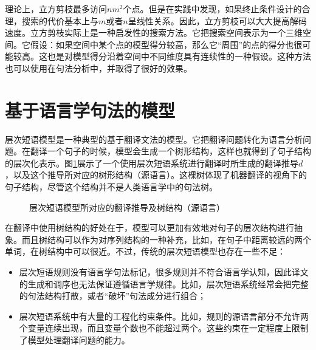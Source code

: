 \parinterval 理论上，立方剪枝最多访问$n{m}^2$个点。但是在实践中发现，如果终止条件设计的合理，搜索的代价基本上与$m$或者$n$呈线性关系。因此，立方剪枝可以大大提高解码速度。立方剪枝实际上是一种启发性的搜索方法。它把搜索空间表示为一个三维空间。它假设：如果空间中某个点的模型得分较高，那么它“周围”的点的得分也很可能较高。这也是对模型得分沿着空间中不同维度具有连续性的一种假设。这种方法也可以使用在句法分析中，并取得了很好的效果。


\sectionnewpage
\section{基于语言学句法的模型}\label{section-8.3}

\parinterval 层次短语模型是一种典型的基于翻译文法的模型。它把翻译问题转化为语言分析问题。在翻译一个句子的时候，模型会生成一个树形结构，这样也就得到了句子结构的层次化表示。图\ref{fig:8-14}展示了一个使用层次短语系统进行翻译时所生成的翻译推导$d$，以及这个推导所对应的树形结构（源语言）。这棵树体现了机器翻译的视角下的句子结构，尽管这个结构并不是人类语言学中的句法树。

\begin{figure}[htp]
\centering

\setlength{\belowcaptionskip}{-0.5em}
\caption{层次短语模型所对应的翻译推导及树结构（源语言）}
\label{fig:8-14}
\end{figure}

\parinterval 在翻译中使用树结构的好处在于，模型可以更加有效地对句子的层次结构进行抽象。而且树结构可以作为对序列结构的一种补充，比如，在句子中距离较远的两个单词，在树结构中可以很近。不过，传统的层次短语模型也存在一些不足：

\begin{itemize}
\vspace{0.5em}
\item 层次短语规则没有语言学句法标记，很多规则并不符合语言学认知，因此译文的生成和调序也无法保证遵循语言学规律。比如，层次短语系统经常会把完整的句法结构打散，或者“破坏”句法成分进行组合；
\vspace{0.5em}
\item 层次短语系统中有大量的工程化约束条件。比如，规则的源语言部分不允许两个变量连续出现，而且变量个数也不能超过两个。这些约束在一定程度上限制了模型处理翻译问题的能力。
\vspace{0.5em}
\end{itemize}

